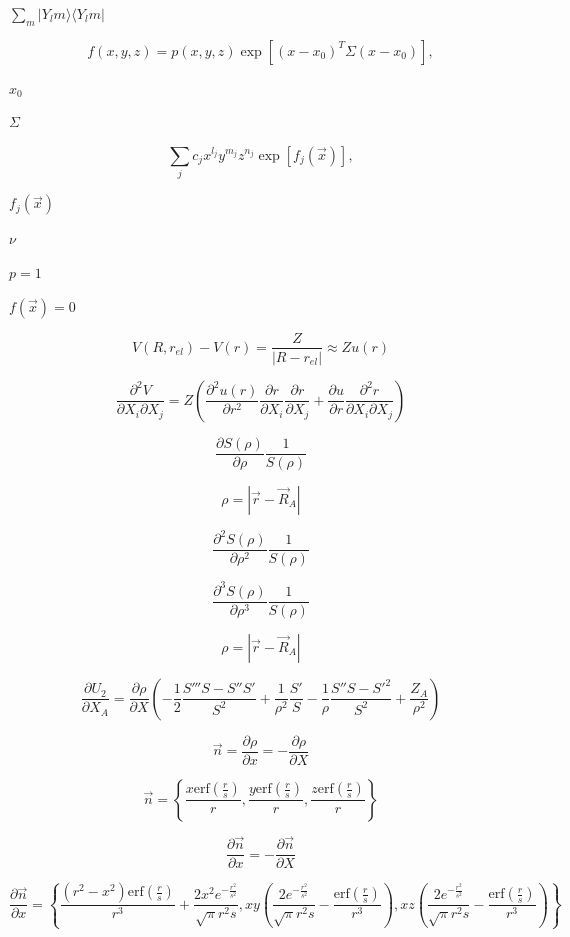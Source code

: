 \documentclass{article}
\begin{document}
$\sum_m |Y_lm \rangle \langle Y_lm|$
\pagebreak

\[
f(x,y,z) = p(x,y,z) \exp[(x-x_0)^T \Sigma (x-x_0)],
\]
\pagebreak

$x_0$
\pagebreak

$\Sigma$
\pagebreak

\[
\sum_j c_j x^{l_j} y^{m_j} z^{n_j} \exp[f_j(\vec{x})],
\]
\pagebreak

$f_j(\vec{x})$
\pagebreak

$\nu$
\pagebreak

$p=1$
\pagebreak

$f(\vec{x})=0$
\pagebreak

\[
V(R,r_{el}) -V(r) =\frac{Z}{|R-r_{el}|} \approx Z u(r) \]
\pagebreak

\[
\frac{\partial^2 V}{\partial X_i\partial X_j}
  =  Z \left(\frac{\partial^2 u(r)}{\partial r^2} \frac{\partial r}{\partial X_i}
     \frac{\partial r}{\partial X_j} + \frac{\partial u}{\partial r}
     \frac{\partial^2 r}{\partial X_i \partial X_j}\right)
\]
\pagebreak

\[
    \frac{\partial S(\rho)}{\partial \rho} \frac{1}{S(\rho)}
\]
\pagebreak

\[
   \rho = |\vec r - \vec R_A |
\]
\pagebreak

\[
    \frac{\partial^2 S(\rho)}{\partial \rho^2} \frac{1}{S(\rho)}
\]
\pagebreak

\[
    \frac{\partial^3 S(\rho)}{\partial \rho^3} \frac{1}{S(\rho)}
\]
\pagebreak

\[
  \rho = \left| \vec r- \vec R_A \right|
\]
\pagebreak

\[
\frac{\partial U_2}{\partial X_A} = \frac{\partial \rho}{\partial X}
          \left(-\frac{1}{2}\frac{S''' S - S'' S'}{S^2} + \frac{1}{\rho^2}\frac{S'}{S}
          - \frac{1}{\rho} \frac{S''S - S'^2}{S^2} + \frac{Z_A}{\rho^2}\right)
\]
\pagebreak

\[
    \vec n  = \frac{\partial \rho}{\partial x} = -\frac{\partial \rho}{\partial X}
\]
\pagebreak

\[
\vec n = \left\{\frac{x \mathrm{erf}\left(\frac{r}{s}\right)}{r},
         \frac{y \mathrm{erf}\left(\frac{r}{s}\right)}{r},
         \frac{z \mathrm{erf}\left(\frac{r}{s}\right)}{r}\right\}
\]
\pagebreak

\[
    \frac{\partial \vec n}{\partial x}  = -\frac{\partial \vec n}{\partial X}
\]
\pagebreak

\[
\frac{\partial\vec n}{\partial x} =
\left\{\frac{\left(r^2-x^2\right) \mathrm{erf}\left(\frac{r}{s}\right)}{r^3}
   +\frac{2 x^2 e^{-\frac{r^2}{s^2}}}{\sqrt{\pi } r^2 s},
 x y \left(\frac{2 e^{-\frac{r^2}{s^2}}}{\sqrt{\pi } r^2 s}
   -\frac{\mathrm{erf}\left(\frac{r}{s}\right)}{r^3}\right),
 x z \left(\frac{2 e^{-\frac{r^2}{s^2}}}{\sqrt{\pi } r^2 s}
   -\frac{\mathrm{erf}\left(\frac{r}{s}\right)}{r^3}\right)\right\}
\]
\pagebreak
\end{document}

